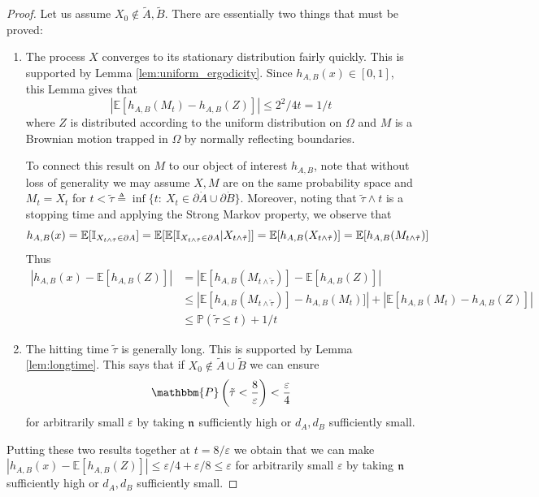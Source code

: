 \documentclass[english, aip, jcp, priprint, graphicx,floatfix]{revtex4-1}
\theoremstyle{plain}
\theoremstyle{definition}
\theoremstyle{plain}
\begin{document}
\begin{proof}
Let us assume $X_0 \notin \tilde A,\tilde B$.  There are essentially two things that must be proved:
\begin{enumerate}
\item The process $X$ converges to its stationary distribution fairly quickly.  This is supported by Lemma \ref{lem:uniform_ergodicity}.  Since $h_{A,B}(x) \in [0,1]$, this Lemma gives that
%
\[
|\mathbb{E}[h_{A,B}(M_t)-h_{A,B}(Z)]| \leq 2^2/4t =1/t
\]
%
where $Z$ is distributed according to the uniform distribution on $\Omega$ and $M$ is a Brownian motion trapped in $\Omega$ by normally reflecting boundaries.  

To connect this result on $M$ to our object of interest $h_{A,B}$, note that without loss of generality we may assume $X,M$ are on the same probability space and $M_t=X_t$ for $t<\tilde\tau \triangleq \inf \{t:\ X_t \in \partial \dot A \cup \partial \dot B\}$.  Moreover, noting that $\tilde\tau\wedge t$ is a stopping time and applying the Strong Markov property, we observe that 
%
\[
h_{A,B}(x) = \mathbb{E} [\mathbb{I}_{X_{t\wedge\tilde\tau} \in \partial A}] 
        = \mathbb{E} [\mathbb{E}[\mathbb{I}_{X_{t\wedge\tilde\tau} \in \partial A} | X_{t\wedge\tilde\tau}]]
        = \mathbb{E} [h_{A,B}(X_{t\wedge\tilde\tau})] = \mathbb{E} [h_{A,B}(M_{t\wedge\tilde\tau})]
\]
%
Thus
\begin{align*}
|h_{A,B}(x) - \mathbb{E}[h_{A,B}(Z)]| &= |\mathbb{E} [h_{A,B}(M_{t\wedge\tilde\tau})] - \mathbb{E}[h_{A,B}(Z)]|\\
&\leq |\mathbb{E} [h_{A,B}(M_{t\wedge\tilde\tau})] - h_{A,B}(M_t)]| + |\mathbb{E} [h_{A,B}(M_{t}) - h_{A,B}(Z)]|\\
&\leq \mathbb{P}(\tilde \tau \leq t) + 1/t
\end{align*}
%

\item The hitting time $\tilde \tau$ is generally long.  This is supported by Lemma \ref{lem:longtime}.  This says that if $X_0 \not\in\tilde{A} \cup \tilde{B}$ we can ensure
%
\[
\mathbbm{P} \left( \tilde{\tau} < \frac{8}{\varepsilon} \right) < \frac{\varepsilon}{4} 
\]
%
for arbitrarily small $\varepsilon$ by taking ${\mathfrak{n}}$ sufficiently high or $d_A,d_B$ sufficiently small.
\end{enumerate}
Putting these two results together at $t=8/\varepsilon$ we obtain that we can make $|h_{A,B}(x) - \mathbb{E}[h_{A,B}(Z)]| \leq \varepsilon / 4 + \varepsilon/8 \leq \varepsilon$ for arbitrarily small $\varepsilon$ by taking ${\mathfrak{n}}$ sufficiently high or $d_A,d_B$ sufficiently small.
\end{proof}
\end{document}
